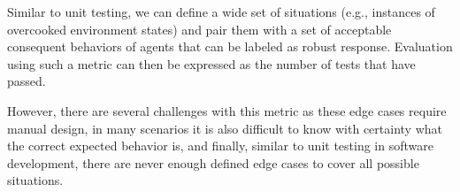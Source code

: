 Similar to unit testing, we can define a wide set of situations (e.g., instances of overcooked environment states) and pair them with a set of acceptable consequent behaviors of agents that can be labeled as robust response.
Evaluation using such a metric can then be expressed as the number of tests that have passed.

However, there are several challenges with this metric as these edge cases require manual design, in many scenarios it is also difficult to know with certainty what the correct expected behavior is, and finally, similar to unit testing in software development, there are never enough defined edge cases to cover all possible situations.